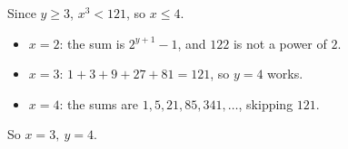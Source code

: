 Since $y\ge3$, $x^3<121$, so $x\le4$.
\begin{itemize}
\item $x=2$: the sum is $2^{y+1}-1$, and $122$ is not a power of $2$.
\item $x=3$: $1+3+9+27+81=121$, so $y=4$ works.
\item $x=4$: the sums are $1,5,21,85,341,\dots$, skipping $121$.
\end{itemize}
So $\boxed{x=3,\ y=4}$.
